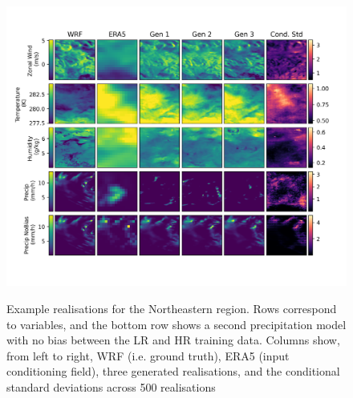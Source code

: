 \documentclass{ametsocV6.1}
\begin{document}
\begin{figure}[H]
  \noindent\includegraphics[width=\textwidth,angle=0]{final/Loc2_Allvars_2Precip.png}\\
  \caption{Example realisations for the Northeastern region. Rows correspond to variables, and the bottom row shows a second precipitation model with no bias between the LR and HR training data. Columns show, from left to right, WRF (i.e. ground truth), ERA5 (input conditioning field), three generated realisations, and the conditional standard deviations across 500 realisations }\label{location2}
\end{figure}
\end{document}
